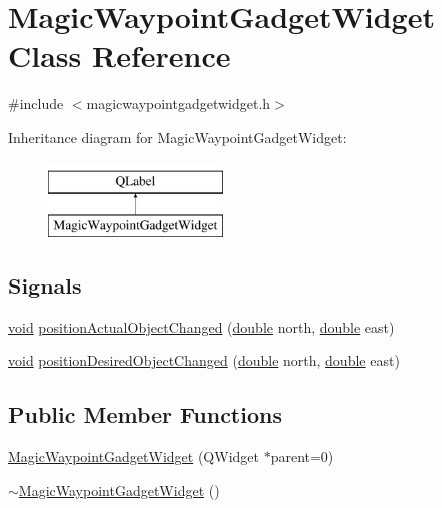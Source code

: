 \hypertarget{class_magic_waypoint_gadget_widget}{\section{Magic\-Waypoint\-Gadget\-Widget Class Reference}
\label{class_magic_waypoint_gadget_widget}
}


{\ttfamily \#include $<$magicwaypointgadgetwidget.\-h$>$}

Inheritance diagram for Magic\-Waypoint\-Gadget\-Widget\-:\begin{figure}[H]
\begin{center}
\leavevmode
\includegraphics[height=2.000000cm]{class_magic_waypoint_gadget_widget}
\end{center}
\end{figure}
\subsection*{Signals}
\begin{DoxyCompactItemize}
\item 
\hyperlink{group___u_a_v_objects_plugin_ga444cf2ff3f0ecbe028adce838d373f5c}{void} \hyperlink{group___g_c_s_control_gadget_plugin_gabd9554a73e1a5f9370d4aefabc29cc96}{position\-Actual\-Object\-Changed} (\hyperlink{_super_l_u_support_8h_a8956b2b9f49bf918deed98379d159ca7}{double} north, \hyperlink{_super_l_u_support_8h_a8956b2b9f49bf918deed98379d159ca7}{double} east)
\item 
\hyperlink{group___u_a_v_objects_plugin_ga444cf2ff3f0ecbe028adce838d373f5c}{void} \hyperlink{group___g_c_s_control_gadget_plugin_ga923489d0d3e251a031fdc66ce20d411b}{position\-Desired\-Object\-Changed} (\hyperlink{_super_l_u_support_8h_a8956b2b9f49bf918deed98379d159ca7}{double} north, \hyperlink{_super_l_u_support_8h_a8956b2b9f49bf918deed98379d159ca7}{double} east)
\end{DoxyCompactItemize}
\subsection*{Public Member Functions}
\begin{DoxyCompactItemize}
\item 
\hyperlink{group___g_c_s_control_gadget_plugin_ga6b1ff9f71795c087e84d4d30b1a60c6d}{Magic\-Waypoint\-Gadget\-Widget} (Q\-Widget $\ast$parent=0)
\item 
\hyperlink{group___g_c_s_control_gadget_plugin_ga2ffd0cf503fdefb31aa45a42b5cf63ba}{$\sim$\-Magic\-Waypoint\-Gadget\-Widget} ()
\end{DoxyCompactItemize}
